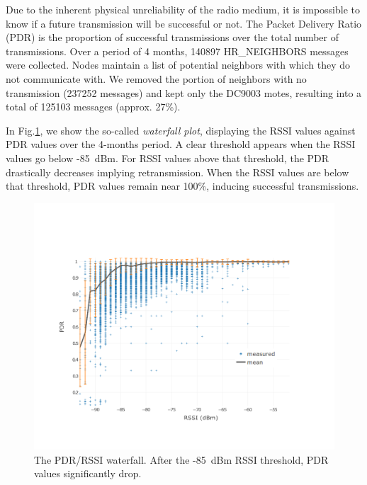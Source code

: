 \documentclass{sig-alternate}
\begin{document}

Due to the inherent physical unreliability of the radio medium, it is impossible to know if a future transmission will be successful or not.
The Packet Delivery Ratio (PDR) is the proportion of successful transmissions over the total number of transmissions.
Over a period of 4 months, 140897 HR\_NEIGHBORS messages were collected.
Nodes maintain a list of potential neighbors with which they do not communicate with.
We removed the portion of neighbors with no transmission (237252 messages) and kept only the DC9003 motes, resulting into a total of 125103 messages (approx. 27\%).


In Fig.\ref{fig:waterfall}, we show the so-called \textit{waterfall plot}, displaying the RSSI values against PDR values over the 4-months period.
A clear threshold appears when the RSSI values go below -85~dBm.
For RSSI values above that threshold, the PDR drastically decreases implying retransmission.
When the RSSI values are below that threshold, PDR values remain near 100\%, inducing successful transmissions.

\begin{figure}
    \centering
    \includegraphics[width=\columnwidth]{waterfall}
    \caption{
        The PDR/RSSI waterfall.
        After the -85~dBm RSSI threshold, PDR values significantly drop.
    }
    \label{fig:waterfall}
\end{figure}

\end{document}
